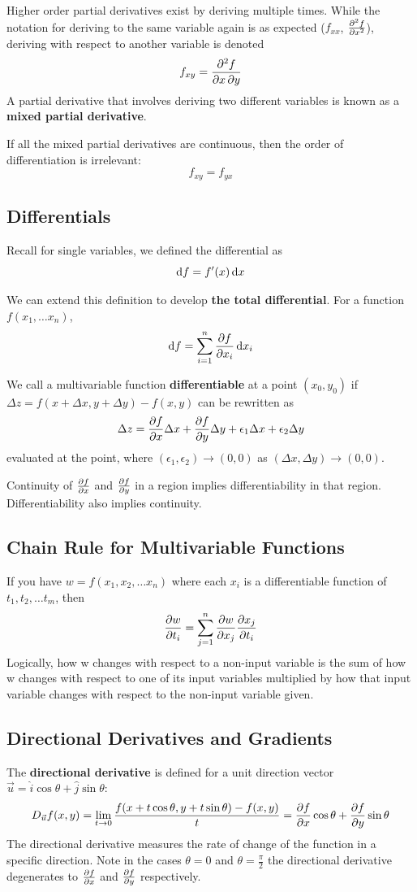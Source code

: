 \documentclass{article}
\begin{document}
Higher order partial derivatives exist by deriving multiple times.
While the notation for deriving to the same variable again is as expected ($f_{xx}$, $\pdv[2]{f}{x}$), deriving with respect to another variable is denoted
\[f_{xy} = \pdv{f}{x, y}\]
A partial derivative that involves deriving two different variables is known as a \textbf{mixed partial derivative}.

If all the mixed partial derivatives are continuous, then the order of differentiation is irrelevant:
\[f_{xy} = f_{yx}\]

\subsection{Differentials}
Recall for single variables, we defined the differential as
\[\odif{f} = f'(x) \odif{x}\]

We can extend this definition to develop \textbf{the total differential}.
For a function $f(x_1, \dots x_n)$,
\[\odif{f} = \sum_{i = 1}^{n} \pdv{f}{x_i} \odif{x_i}\]

We call a multivariable function \textbf{differentiable} at a point $(x_0, y_0)$ if $\Delta z = f(x + \Delta x, y + \Delta y) - f(x, y)$ can be rewritten as
\[\Delta z = \pdv{f}{x} \Delta x + \pdv{f}{y} \Delta y + \epsilon_1 \Delta x + \epsilon_2 \Delta y\]
evaluated at the point, where $(\epsilon_1, \epsilon_2) \to (0,0)$ as $(\Delta x, \Delta y) \to (0, 0)$.

Continuity of $\pdv{f}{x}$ and $\pdv{f}{y}$ in a region implies differentiability in that region.
Differentiability also implies continuity.

\subsection{Chain Rule for Multivariable Functions}
If you have $w = f(x_1, x_2, \dots x_n)$ where each $x_i$ is a differentiable function of $t_1, t_2, \dots t_m$, then
\[\pdv{w}{t_i} = \sum_{j = 1}^{n} \pdv{w}{x_j} \pdv{x_j}{t_i}\]
Logically, how w changes with respect to a non-input variable is the sum of how w changes with respect to one of its input variables multiplied by how that input variable changes with respect to the non-input variable given. 

\subsection{Directional Derivatives and Gradients}
The \textbf{directional derivative} is defined for a unit direction vector $\vec{u} = \hat{i} \cos \theta + \hat{j} \sin \theta$:
\[D_{\vec{u}}f(x,y) = \lim_{t \to 0} \frac{f(x + t\cos\theta, y + t\sin\theta) - f(x,y)}{t} = \pdv{f}{x}\cos\theta + \pdv{f}{y}\sin\theta\]
The directional derivative measures the rate of change of the function in a specific direction.
Note in the cases $\theta = 0$ and $\theta = \frac{\pi}{2}$ the directional derivative degenerates to $\pdv{f}{x}$ and $\pdv{f}{y}$ respectively.
\end{document}
